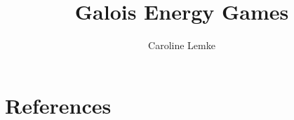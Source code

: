 \documentclass[11pt,a4paper]{article}
\begin{document}
\title{Galois Energy Games}
\author{Caroline Lemke}
\maketitle

\tableofcontents


\newpage

\newpage

\newpage

\newpage

\newpage

\newpage


\newpage
\section{References}



\newpage
\appendix

\end{document}

